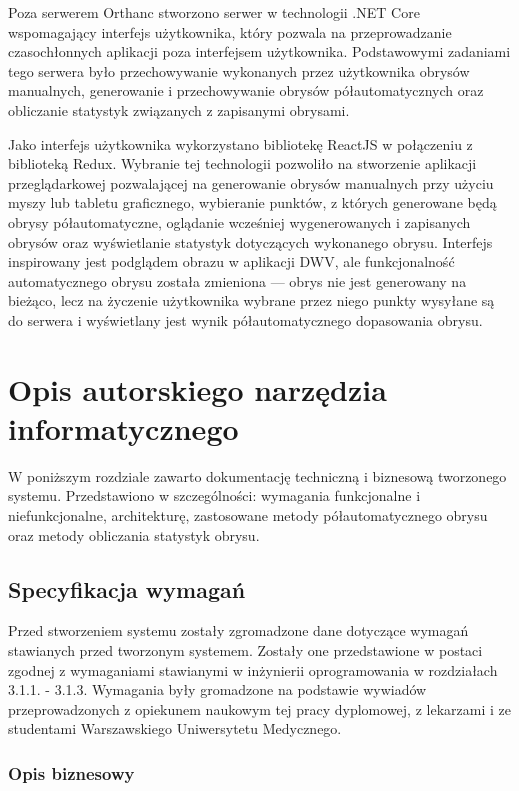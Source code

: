 \documentclass[a4paper,11pt,twoside,openright]{report}
\theoremstyle{definition}
\begin{document}
Poza serwerem Orthanc stworzono serwer w technologii .NET Core \cite{Dotnet} wspomagający interfejs użytkownika, który pozwala na przeprowadzanie czasochłonnych aplikacji poza interfejsem użytkownika. Podstawowymi zadaniami tego serwera było przechowywanie wykonanych przez użytkownika obrysów manualnych, generowanie i przechowywanie obrysów półautomatycznych oraz obliczanie statystyk związanych z zapisanymi obrysami.

Jako interfejs użytkownika wykorzystano bibliotekę ReactJS \cite{React} w połączeniu z biblioteką Redux. Wybranie tej technologii pozwoliło na stworzenie aplikacji przeglądarkowej pozwalającej na generowanie obrysów manualnych przy użyciu myszy lub tabletu graficznego, wybieranie punktów, z których generowane będą obrysy półautomatyczne, oglądanie wcześniej wygenerowanych i zapisanych obrysów oraz wyświetlanie statystyk dotyczących wykonanego obrysu. Interfejs inspirowany jest podglądem obrazu w aplikacji DWV, ale funkcjonalność automatycznego obrysu została zmieniona --- obrys nie jest generowany na bieżąco, lecz na życzenie użytkownika wybrane przez niego punkty wysyłane są do serwera i wyświetlany jest wynik półautomatycznego dopasowania obrysu.

\chapter {Opis autorskiego narzędzia informatycznego}

W poniższym rozdziale zawarto dokumentację techniczną i biznesową tworzonego systemu. Przedstawiono w szczególności: wymagania funkcjonalne i niefunkcjonalne, architekturę, zastosowane metody półautomatycznego obrysu oraz metody obliczania statystyk obrysu.

\section {Specyfikacja wymagań}

Przed stworzeniem systemu zostały zgromadzone dane dotyczące wymagań stawianych przed tworzonym systemem. Zostały one przedstawione w postaci zgodnej z wymaganiami stawianymi w inżynierii oprogramowania w rozdziałach 3.1.1. - 3.1.3. Wymagania były gromadzone na podstawie wywiadów przeprowadzonych z opiekunem naukowym tej pracy dyplomowej, z lekarzami i ze studentami Warszawskiego Uniwersytetu Medycznego.

\subsection {Opis biznesowy}
\end{document}
